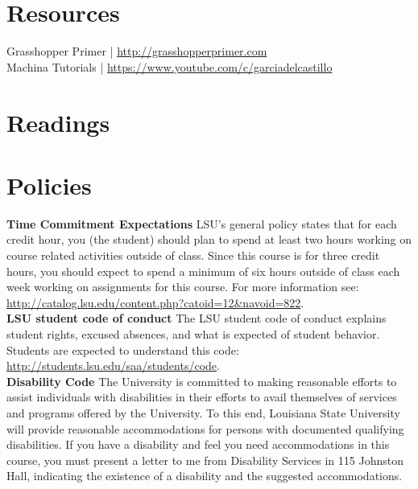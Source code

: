 \documentclass[11pt,article,oneside]{memoir}
\begin{document}

\section{Resources}
Grasshopper Primer | \url{http://grasshopperprimer.com}\\
Machina Tutorials | \url{https://www.youtube.com/c/garciadelcastillo}

\section{Readings}
\vspace*{0.5cm}
\nocite{*}
\setlength{}
\printbibliography[heading=none]
\clearpage

\section{Policies}

\noindent \textbf{Time Commitment Expectations}
LSU's general policy states that for each credit hour, you (the student) should plan to
spend at least two hours working on course related activities outside of class. Since this course is for three credit hours, you should expect to spend a minimum of six hours outside of class each week working on assignments for this course. For more information see: 
\url{http://catalog.lsu.edu/content.php?catoid=12&navoid=822}.\\

\noindent \textbf{LSU student code of conduct}
The LSU student code of conduct explains student rights, excused absences, and what is expected of student behavior. Students are expected to understand this code:  \url{http://students.lsu.edu/saa/students/code}.\\ %

\noindent \textbf{Disability Code}
The University is committed to making reasonable efforts to assist individuals with disabilities in
their efforts to avail themselves of services and programs offered by the University. To this end,
Louisiana State University will provide reasonable accommodations for persons with
documented qualifying disabilities. If you have a disability and feel you need accommodations in
this course, you must present a letter to me from Disability Services in 115 Johnston Hall,
indicating the existence of a disability and the suggested accommodations.\\
\end{document}
